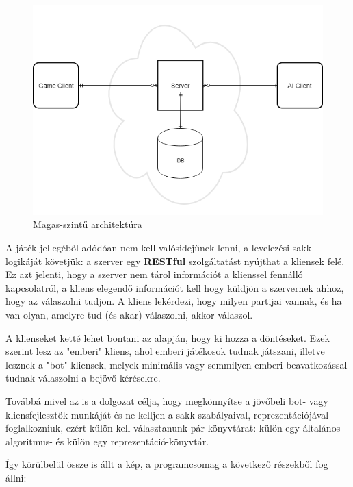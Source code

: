 \documentclass[twoside, a4paper, 12pt]{article}
\begin{document}
\begin{figure}[htbp]
	\centering
	\includegraphics[width=1.0\textwidth]{img/highLevelArchitecture.png}
	\caption{Magas-szintű architektúra}
	\label{fig:highLevelArchitecture}
\end{figure}

A játék jellegéből adódóan nem kell valósidejűnek lenni, a levelezési-sakk logikáját követjük: a szerver egy \textbf{RESTful} szolgáltatást nyújthat a kliensek felé. Ez azt jelenti, hogy a szerver nem tárol információt a klienssel fennálló kapcsolatról, a kliens elegendő információt kell hogy küldjön a szervernek ahhoz, hogy az válaszolni tudjon. A kliens lekérdezi, hogy milyen partijai vannak, és ha van olyan, amelyre tud (és akar) válaszolni, akkor válaszol.

A klienseket ketté lehet bontani az alapján, hogy ki hozza a döntéseket. Ezek szerint lesz az "emberi" kliens, ahol emberi játékosok tudnak játszani, illetve lesznek a "bot" kliensek, melyek minimális vagy semmilyen emberi beavatkozással tudnak válaszolni a bejövő kérésekre.

Továbbá mivel az is a dolgozat célja, hogy megkönnyítse a jövőbeli bot- vagy kliensfejlesztők munkáját és ne kelljen a sakk szabályaival, reprezentációjával foglalkozniuk, ezért külön kell választanunk pár könyvtárat: külön egy általános algoritmus- és külön egy reprezentáció-könyvtár.

Így körülbelül össze is állt a kép, a programcsomag a következő részekből fog állni:
\end{document}
